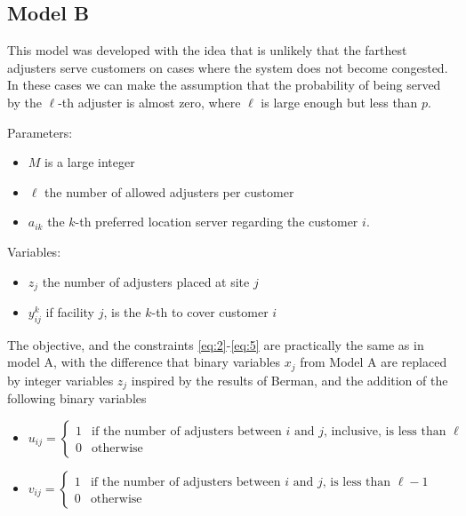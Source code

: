 
\subsection{Model B}

This model
was developed with the idea
that is unlikely that the farthest adjusters
serve customers on cases where the system does not become congested.
In these cases
we can make the assumption that
the probability of being served by the $\ell$-th 
adjuster is almost zero,
where $\ell$ is large enough but less than $p$.

Parameters:
\begin{itemize}
\item $M$ is a large integer
\item $\ell$ the number of allowed adjusters per customer
\item $a_{ik}$ the $k$-th preferred location server
  regarding the customer $i$.
\end{itemize}

Variables:
\begin{itemize}
\item $z_j$ the number of adjusters placed at site $j$
\item $y_{ij}^k$ if facility $j$,
  is the $k$-th to cover customer $i$
\end{itemize}

The objective,
and the constraints \ref{eq:2}-\ref{eq:5} 
are practically the same as in model A,
with the difference that
binary variables $x_j$ from Model A
are replaced by integer variables $z_j$
inspired by the results of Berman,
and the addition of the following binary variables
{\small
  \begin{itemize}
  \item $u_{ij} = 
    \begin{cases}
      1 & \mbox{if the number of adjusters between } i 
      \mbox{ and } j \mbox{, inclusive, is less than } \ell \\
      0 & \mbox{otherwise}
    \end{cases}$
  \item $v_{ij} = 
    \begin{cases} 
      1 & \mbox{if the number of adjusters between } i
      \mbox{ and } j \mbox{, is less than } \ell - 1 \\
      0 & \mbox{otherwise}
    \end{cases}$
  \end{itemize}
}

